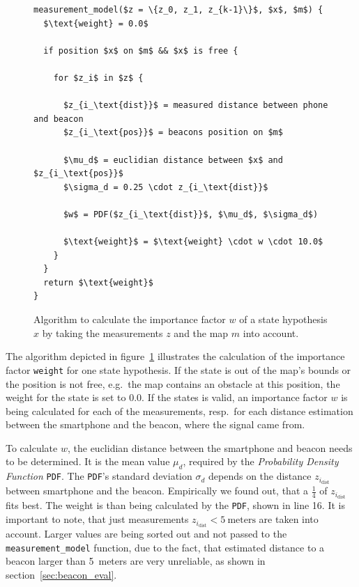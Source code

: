 \begin{figure}
\begin{lstlisting}[mathescape]
measurement_model($z = \{z_0, z_1, z_{k-1}\}$, $x$, $m$) {
  $\text{weight} = 0.0$
  
  if position $x$ on $m$ && $x$ is free {
    
    for $z_i$ in $z$ {
      
      $z_{i_\text{dist}}$ = measured distance between phone and beacon
      $z_{i_\text{pos}}$ = beacons position on $m$
    
      $\mu_d$ = euclidian distance between $x$ and $z_{i_\text{pos}}$
      $\sigma_d = 0.25 \cdot z_{i_\text{dist}}$
      
      $w$ = PDF($z_{i_\text{dist}}$, $\mu_d$, $\sigma_d$)
      
      $\text{weight}$ = $\text{weight} \cdot w \cdot 10.0$ 
    }
  }
  return $\text{weight}$
}
\end{lstlisting}
\caption{Algorithm to calculate the importance factor $w$ of a state hypothesis $x$ by taking the measurements $z$ and the map $m$ into account.}
\label{lst:mm_importancefactor}
\end{figure}

The algorithm depicted in figure~\ref{lst:mm_importancefactor} illustrates the calculation of the importance factor \texttt{weight} for one state hypothesis. If the state is out of the map's bounds or the position is not free, e.g.\ the map contains an obstacle at this position, the weight for the state is set to $0.0$. If the states is valid, an importance factor $w$ is being calculated for each of the measurements, resp.\ for each distance estimation between the smartphone and the beacon, where the signal came from.

To calculate $w$, the euclidian distance between the smartphone and beacon needs to be determined. It is the mean value $\mu_d$, required by the \emph{Probability Density Function} \texttt{PDF}. The \texttt{PDF}'s standard deviation $\sigma_d$ depends on the distance $z_{i_\text{dist}}$ between smartphone and the beacon. Empirically we found out, that a $\frac{1}{4}$ of $z_{i_\text{dist}}$ fits best. The weight is than being calculated by the \texttt{PDF}, shown in line 16. It is important to note, that just measurements $z_{i_\text{dist}} < 5~\text{meters}$ are taken into account. Larger values are being sorted out and not passed to the \texttt{measurement\_model} function, due to the fact, that estimated distance to a beacon larger than 5~meters are very unreliable, as shown in section~\ref{sec:beacon_eval}.

